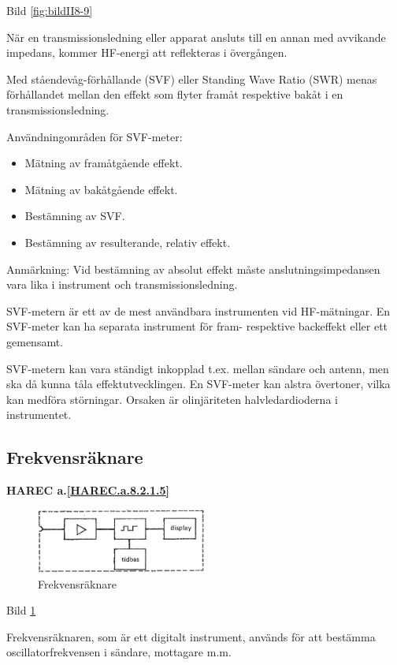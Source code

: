Bild \ref{fig:bildII8-9}

När en transmissionsledning eller apparat ansluts till en annan med
avvikande impedans, kommer HF-energi att reflekteras i övergången.

Med ståendevåg-förhållande (SVF) eller Standing Wave Ratio (SWR)
menas förhållandet mellan den effekt som flyter framåt respektive
bakåt i en transmissionsledning.

Användningområden för SVF-meter:
\begin{itemize}
\item Mätning av framåtgående effekt.
\item Mätning av bakåtgående effekt.
\item Bestämning av SVF.
\item Bestämning av resulterande, relativ effekt.
\end{itemize}

Anmärkning: Vid bestämning av absolut effekt måste
anslutningsimpedansen vara lika i instrument och transmissionsledning.

SVF-metern är ett av de mest användbara instrumenten vid
HF-mätningar. En SVF-meter kan ha separata instrument för fram-
respektive backeffekt eller ett gemensamt.

SVF-metern kan vara ständigt inkopplad t.ex. mellan sändare och
antenn, men ska då kunna tåla effektutvecklingen. En SVF-meter kan
alstra övertoner, vilka kan medföra störningar. Orsaken är
olinjäriteten halvledardioderna i instrumentet.

\subsection{Frekvensräknare}
\textbf{
HAREC a.\ref{HAREC.a.8.2.1.5}\label{myHAREC.a.8.2.1.5}
}

\begin{figure}
  \includegraphics[width=0.5\textwidth]{images/cropped_pdfs/bild_2_8-10.pdf}
  \caption{Frekvensräknare}
  \label{fig:bildII8-10}
\end{figure}

Bild \ref{fig:bildII8-10}

Frekvensräknaren, som är ett digitalt instrument, används för att
bestämma oscillatorfrekvensen i sändare, mottagare m.m.

